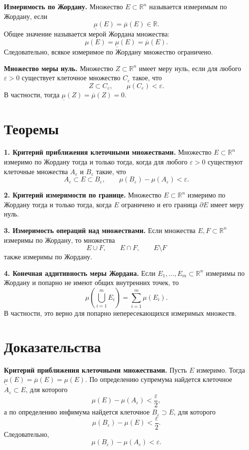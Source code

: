 \documentclass[12pt,a4paper]{article}
\newcommand{\R}{\mathbb{R}}
\newcommand{\eps}{\varepsilon}
\newcommand{\Fr}{\partial}
\newcommand{\lowmu}{\underline{\mu}}
\newcommand{\upmu}{\overline{\mu}}
\begin{document}
\textbf{Измеримость по Жордану.}
Множество \(E\subset\R^n\) называется измеримым по Жордану, если
\[
  \lowmu(E)=\upmu(E)\in\R.
\]
Общее значение называется мерой Жордана множества:
\[
  \mu(E)=\lowmu(E)=\upmu(E).
\]
Следовательно, всякое измеримое по Жордану множество ограничено.

\textbf{Множество меры нуль.}
Множество \(Z\subset\R^n\) имеет меру нуль, если для любого \(\eps>0\)
существует клеточное множество \(C_\eps\) такое, что
\[
  Z\subset C_\eps,\qquad \mu(C_\eps)<\eps.
\]
В частности, тогда \(\lowmu(Z)=\upmu(Z)=0\).

\section*{Теоремы}

\textbf{1. Критерий приближения клеточными множествами.}
Множество \(E\subset\R^n\) измеримо по Жордану тогда и только тогда, когда для
любого \(\eps>0\) существуют клеточные множества \(A_\eps\) и \(B_\eps\) такие,
что
\[
  A_\eps\subset E\subset B_\eps,
  \qquad
  \mu(B_\eps)-\mu(A_\eps)<\eps.
\]

\textbf{2. Критерий измеримости по границе.}
Множество \(E\subset\R^n\) измеримо по Жордану тогда и только тогда, когда
\(E\) ограничено и его граница \(\Fr E\) имеет меру нуль.

\textbf{3. Измеримость операций над множествами.}
Если множества \(E,F\subset\R^n\) измеримы по Жордану, то множества
\[
  E\cup F,\qquad E\cap F,\qquad E\setminus F
\]
также измеримы по Жордану.

\textbf{4. Конечная аддитивность меры Жордана.}
Если \(E_1,\dots,E_m\subset\R^n\) измеримы по Жордану и попарно не имеют общих
внутренних точек, то
\[
  \mu\left(\bigcup_{i=1}^m E_i\right)
  =
  \sum_{i=1}^m\mu(E_i).
\]
В частности, это верно для попарно непересекающихся измеримых множеств.

\section*{Доказательства}

\textbf{Критерий приближения клеточными множествами.}
Пусть \(E\) измеримо. Тогда \(\lowmu(E)=\upmu(E)=\mu(E)\). По определению
супремума найдется клеточное \(A_\eps\subset E\), для которого
\[
  \mu(E)-\mu(A_\eps)<\frac{\eps}{2},
\]
а по определению инфимума найдется клеточное \(B_\eps\supset E\), для которого
\[
  \mu(B_\eps)-\mu(E)<\frac{\eps}{2}.
\]
Следовательно,
\[
  \mu(B_\eps)-\mu(A_\eps)<\eps.
\]
\end{document}
